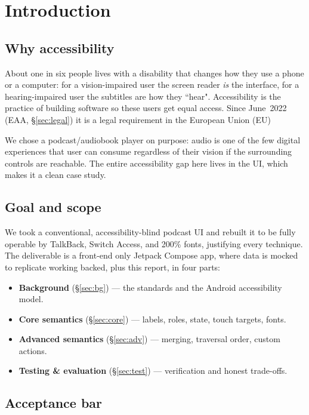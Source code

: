 \section{Introduction}

\subsection{Why accessibility}

About one in six people lives with a disability that changes how they use a phone or a computer: for a vision-impaired user
the screen reader \emph{is} the interface, for a hearing-impaired user the subtitles are how they ``hear". Accessibility is the practice of building software so
these users get equal access. Since June~2022 (EAA, §\ref{sec:legal}) it is a legal
requirement in the European Union (EU)

We chose a podcast/audiobook player on purpose: audio is one of the few digital experiences that user can consume regardless of their vision if the surrounding controls
are reachable. The entire accessibility gap here lives in the UI, which makes it a clean case study.

\subsection{Goal and scope}

We took a conventional, accessibility-blind podcast UI and rebuilt it to be fully operable by
TalkBack, Switch Access, and 200\% fonts, justifying every technique. The deliverable is a
front-end only Jetpack Compose app, where data is mocked to replicate working backed, plus
this report, in four parts:

\begin{itemize}[leftmargin=1.4em,itemsep=1pt]
	\item \textbf{Background} (§\ref{sec:bg}) --- the standards and the Android accessibility model.
	\item \textbf{Core semantics} (§\ref{sec:core}) --- labels, roles, state, touch targets, fonts.
	\item \textbf{Advanced semantics} (§\ref{sec:adv}) --- merging, traversal order, custom actions.
	\item \textbf{Testing \& evaluation} (§\ref{sec:test}) --- verification and honest trade-offs.
\end{itemize}

\subsection{Acceptance bar}

